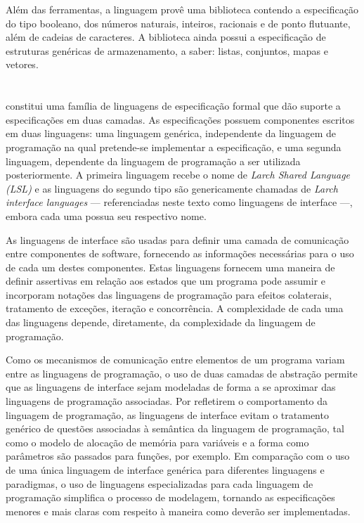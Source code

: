 Além das ferramentas, a linguagem \Maude provê uma biblioteca contendo a especificação do tipo booleano, dos números naturais, inteiros, racionais e de ponto flutuante, além de cadeias de caracteres. A biblioteca ainda possui a especificação de estruturas genéricas de armazenamento, a saber: listas, conjuntos, mapas e vetores.


\section{\Larch}\label{chap:revisaobib:larch}

\Larch \cite{LarchBook} constitui uma família de linguagens de especificação formal que dão suporte a especificações em duas camadas.
As especificações possuem componentes escritos em duas linguagens: uma linguagem genérica, independente da linguagem de programação na qual pretende-se implementar a especificação, e uma segunda linguagem, dependente da linguagem de programação a ser utilizada posteriormente.
A primeira linguagem recebe o nome de \textit{Larch Shared Language (LSL)} e as linguagens do segundo tipo são genericamente chamadas de \textit{Larch interface languages} --- referenciadas neste texto como linguagens de interface ---, embora cada uma possua seu respectivo nome.

As linguagens de interface são usadas para definir uma camada de comunicação entre componentes de software, fornecendo as informações necessárias para o uso de cada um destes componentes.
Estas linguagens fornecem uma maneira de definir assertivas em relação aos estados que um programa pode assumir e incorporam notações das linguagens de programação para efeitos colaterais, tratamento de exceções, iteração e concorrência.
A complexidade de cada uma das linguagens depende, diretamente, da complexidade da linguagem de programação.

Como os mecanismos de comunicação entre elementos de um programa variam entre as linguagens de programação, o uso de duas camadas de abstração permite que as linguagens de interface sejam modeladas de forma a se aproximar das linguagens de programação associadas.
Por refletirem o comportamento da linguagem de programação, as linguagens de interface evitam o tratamento genérico de questões associadas à semântica da linguagem de programação, tal como o modelo de alocação de memória para variáveis e a forma como parâmetros são passados para funções, por exemplo.
Em comparação com o uso de uma única linguagem de interface genérica para diferentes linguagens e paradigmas, o uso de linguagens especializadas para cada linguagem de programação simplifica o processo de modelagem, tornando as especificações menores e mais claras com respeito à maneira como deverão ser implementadas.

